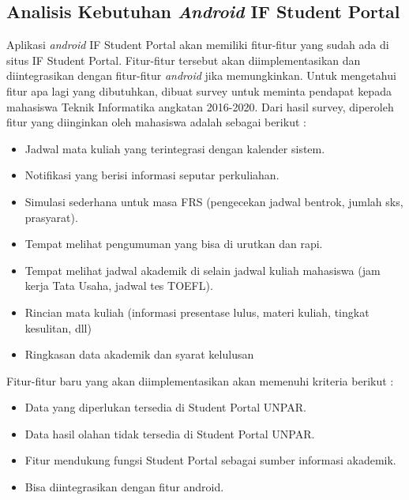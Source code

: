 \subsection{Analisis Kebutuhan \textit{Android} IF Student Portal}
\label{kebutuhan}
Aplikasi \textit{android} IF Student Portal akan memiliki fitur-fitur yang sudah ada di situs IF Student Portal. Fitur-fitur tersebut akan diimplementasikan dan diintegrasikan dengan fitur-fitur \textit{android} jika memungkinkan. Untuk mengetahui fitur apa lagi yang dibutuhkan, dibuat survey untuk meminta pendapat kepada mahasiswa Teknik Informatika angkatan 2016-2020. Dari hasil survey, diperoleh fitur yang diinginkan oleh mahasiswa adalah sebagai berikut :
\begin{itemize}
    \item Jadwal mata kuliah yang terintegrasi dengan kalender sistem.
    \item Notifikasi yang berisi informasi seputar perkuliahan.
    \item Simulasi sederhana untuk masa FRS (pengecekan jadwal bentrok, jumlah sks, prasyarat).
    \item Tempat melihat pengumuman yang bisa di urutkan dan rapi.
    \item Tempat melihat jadwal akademik di selain jadwal kuliah mahasiswa (jam kerja Tata Usaha, jadwal tes TOEFL). 
    \item Rincian mata kuliah (informasi presentase lulus, materi kuliah, tingkat kesulitan, dll)
    \item Ringkasan data akademik dan syarat kelulusan
\end{itemize}

Fitur-fitur baru yang akan diimplementasikan akan memenuhi kriteria berikut :
\begin{itemize}
    \item Data yang diperlukan tersedia di Student Portal UNPAR.
    \item Data hasil olahan tidak tersedia  di Student Portal UNPAR.
    \item Fitur mendukung fungsi Student Portal sebagai sumber informasi akademik.
    \item Bisa diintegrasikan dengan fitur android.
\end{itemize}


